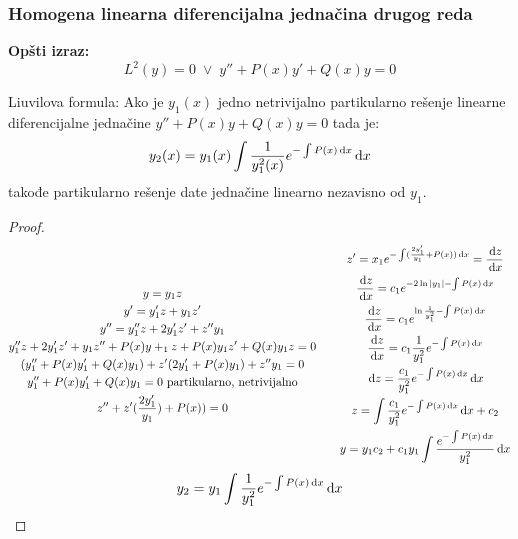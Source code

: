 \subsubsection{Homogena linearna diferencijalna jednačina drugog reda}
	\textbf{Opšti izraz: }
	$$ L^2(y) = 0 \; \lor \; y'' + P(x)y' + Q(x) y = 0 $$
	\begin{theorem}
		Liuvilova formula: Ako je $y_1(x)$ jedno netrivijalno partikularno rešenje linearne diferencijalne jednačine $y'' + P(x)y+ Q(x)y = 0$ tada je:
		$$y_2(x) = y_1(x) \int \frac{1}{y_1^2(x)} e^{-\int P(x) \, \mathrm{d} x} \, \mathrm{d} x$$
		takođe partikularno rešenje date jednačine linearno nezavisno od $y_1$.
	\end{theorem}
	\begin{proof}
		\begin{align*}
			\begin{gathered}
				y = y_1z\\
				y' = y'_1z + y_1 z'\\
				y'' = y''_1z + 2y'_1z' + z''y_1\\
				y''_1z+2y'_1z' + y_1z'' + P(x)y+_1z + P(x)y_1z' + Q(x)y_1z = 0\\
				(y''_1 + P(x)y'_1 + Q(x)y_1) + z'(2y'_1 + P(x)y_1) + z''y_1 = 0\\
				y''_1 + P(x)y'_1 + Q(x)y_1 = 0 \text{ partikularno, netrivijalno}\\
				z'' + z'(\frac{2y'_1}{y_1})+ P(x)) = 0\\
			\end{gathered}
			\quad \quad
			\begin{gathered}
				z' = x_1 e^{-\int (\frac{2y'_1}{y_1}+P(x)) \, \mathrm{d} x} = \frac{\, \mathrm{d} z}{\, \mathrm{d} x}\\
				\frac{\, \mathrm{d} z}{\, \mathrm{d} x} = c_1 e^{-2\ln |y_1|-\int P(x) \, \mathrm{d} x}\\
				\frac{\, \mathrm{d} z}{\, \mathrm{d} x} = c_1 e^{\ln \frac{1}{y_1^2}-\int P(x) \, \mathrm{d} x}\\
				\frac{\, \mathrm{d} z}{\, \mathrm{d} x} = c_1 \frac{1}{y_1^2}e^{-\int P(x) \, \mathrm{d} x}\\
				\, \mathrm{d} z = \frac{c_1}{y_1^2} e^{-\int P(x) \, \mathrm{d} x} \, \mathrm{d} x\\
				z = \int \frac{c_1}{y_1^2} e^{-\int P(x) \, \mathrm{d} x} \, \mathrm{d} x + c_2\\
				y = y_1c_2 + c_1y_1 \int \frac{e^{- \int P(x) \, \mathrm{d} x}}{y_1^2} \, \mathrm{d} x\\
			\end{gathered}
		\end{align*}
		$$ y_2 = y_1 \int \frac{1}{y_1^2} e^{- \int P(x) \, \mathrm{d} x} \, \mathrm{d} x $$
	\end{proof}


